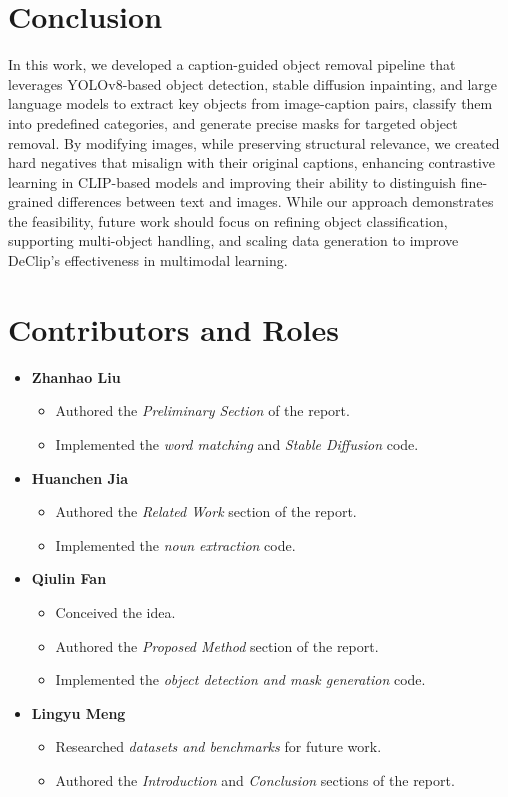\documentclass[11pt,letterpaper]{article}
\begin{document}
\section{Conclusion}
In this work, we developed a caption-guided object removal pipeline that leverages YOLOv8-based object detection, stable diffusion inpainting, and large language models to extract key objects from image-caption pairs, classify them into predefined categories, and generate precise masks for targeted object removal. By modifying images, while preserving structural relevance, we created hard negatives that misalign with their original captions, enhancing contrastive learning in CLIP-based models and improving their ability to distinguish fine-grained differences between text and images. While our approach demonstrates the feasibility, future work should focus on refining object classification, supporting multi-object handling, and scaling data generation to improve DeClip’s effectiveness in multimodal learning.



\section{Contributors and Roles}
\begin{itemize}
    \item \textbf{Zhanhao Liu} 
    \begin{itemize}
        \item Authored the \emph{Preliminary Section} of the report.
        \item Implemented the \emph{word matching} and \emph{Stable Diffusion} code.
    \end{itemize}
    \item \textbf{Huanchen Jia} 
    \begin{itemize}
        \item Authored the \emph{Related Work} section of the report.
        \item Implemented the \emph{noun extraction} code.
    \end{itemize}
    \item \textbf{Qiulin Fan} 
    \begin{itemize}
        \item Conceived the idea.
        \item Authored the \emph{Proposed Method} section of the report.
        \item Implemented the \emph{object detection and mask generation} code.
    \end{itemize}
    \item \textbf{Lingyu Meng} 
    \begin{itemize}
        \item Researched \emph{datasets and benchmarks} for future work.
        \item Authored the \emph{Introduction} and \emph{Conclusion} sections of the report.
    \end{itemize}
\end{itemize}
\end{document}

